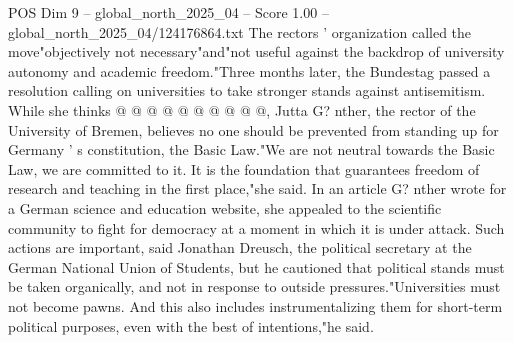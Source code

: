 \begin{textsample}{POS Dim 9 – global\_north\_2025\_04 – Score 1.00 – global\_north\_2025\_04/124176864.txt}
The rectors ' organization called the move"objectively not necessary"and"not useful against the backdrop of university autonomy and academic freedom."Three months later, the Bundestag passed a resolution calling on universities to take stronger stands against antisemitism.
While she thinks @ @ @ @ @ @ @ @ @ @, Jutta G? nther, the rector of the University of Bremen, believes no one should be prevented from standing up for Germany ' s constitution, the Basic Law."We are not neutral towards the Basic Law, we are committed to it.
It is the foundation that guarantees freedom of research and teaching in the first place,"she said.
In an article G? nther wrote for a German science and education website, she appealed to the scientific community to fight for democracy at a moment in which it is under attack.
Such actions are important, said Jonathan Dreusch, the political secretary at the German National Union of Students, but he cautioned that political stands must be taken organically, and not in response to outside pressures."Universities must not become pawns.
And this also includes instrumentalizing them for short-term political purposes, even with the best of intentions,"he said.

\end{textsample}
